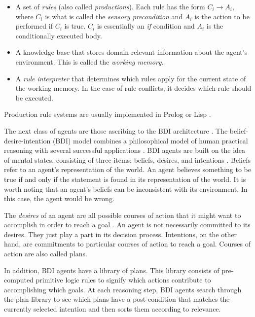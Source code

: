 \begin{itemize}

    \item A set of \textit{rules} (also called \textit{productions}).
        Each rule has the form $ C_i \rightarrow A_i $,
        where $ C_i $ is what is called the \textit{sensory precondition}
        and $ A_i $ is the action to be performed if $ C_i $ is true.
        $ C_i $ is essentially an \textit{if} condition and $ A_i $ is the conditionally executed body.

    \item A knowledge base that stores domain-relevant information about the agent's environment.
        This is called the \textit{working memory}.

    \item A \textit{rule interpreter} that determines which rules apply for the current state of the working memory.
        In the case of rule conflicts, it decides which rule should be executed.

\end{itemize}


Production rule systems are usually implemented in Prolog or Lisp \cite{balke_how_2014}.

The next class of agents are those ascribing to the BDI architecture \cite{balke_how_2014}.
The belief-desire-intention (BDI) model combines a philosophical model of human practical reasoning
with several successful applications \cite{georgeff_belief-desire-intention_1999}.
BDI agents are built on the idea of mental states,
consisting of three items: beliefs, desires, and intentions \cite{balke_how_2014}.
Beliefs refer to an agent's representation of the world.
An agent believes something to be true if and only if the statement is found in its representation of the world.
It is worth noting that an agent's beliefs can be inconsistent with its environment.
In this case, the agent would be wrong.

The \textit{desires} of an agent are all possible courses of action that it might want to accomplish in order to reach a goal \cite{balke_how_2014}.
An agent is not necessarily committed to its desires.
They just play a part in its decision process.
Intentions, on the other hand, are commitments to particular courses of action to reach a goal.
Courses of action are also called plans.

In addition, BDI agents have a library of plans.
This library consists of pre-computed primitive logic rules to signify which actions contribute to accomplishing which goals.
At each reasoning step, BDI agents search through the plan library to see which plans have a post-condition that matches the currently selected intention
and then sorts them according to relevance.

